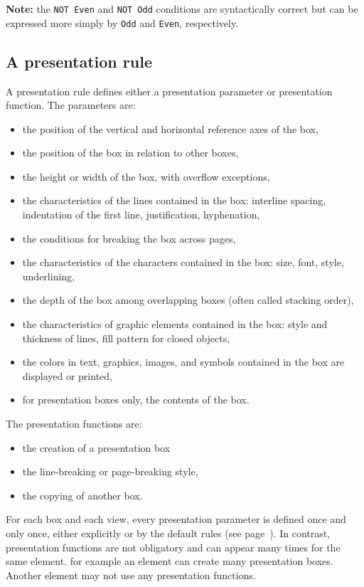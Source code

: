 {\bf Note:} the {\tt NOT Even} and {\tt NOT Odd} conditions are
syntactically correct but can be expressed more simply by {\tt Odd}
and {\tt Even}, respectively.

\subsection{A presentation rule}
\label{reglepres}

A presentation rule defines either a presentation parameter or
presentation function.  The parameters are:
\begin{itemize}
\item the position of the vertical and horizontal reference axes of
the box,
\item the position of the box in relation to other boxes,
\item the height or width of the box, with overflow exceptions,
\item the characteristics of the lines contained in the box: interline
spacing, indentation of the first line, justification, hyphenation,
\item the conditions for breaking the box across pages,
\item the characteristics of the characters contained in the box:
size, font, style, underlining,
\item the depth of the box among overlapping boxes (often called
stacking order),
\item the characteristics of graphic elements contained in the box:
style and thickness of lines, fill pattern for closed objects,
\item the colors in text, graphics, images, and symbols contained in
the box are displayed or printed,
\item for presentation boxes only, the contents of the box.
\end{itemize}
The presentation functions are:
\label{fonctpres}
\begin{itemize}
\item the creation of a presentation box
\item the line-breaking or page-breaking style,
\item the copying of another box.
\end{itemize}

For each box and each view, every presentation parameter is defined
once and only once, either explicitly or by the default rules (see
page~\pageref{reglesdefaut}).  In contrast, presentation functions are
not obligatory and can appear many times for the same element.  for
example an element can create many presentation boxes.  Another
element may not use any presentation functions.

